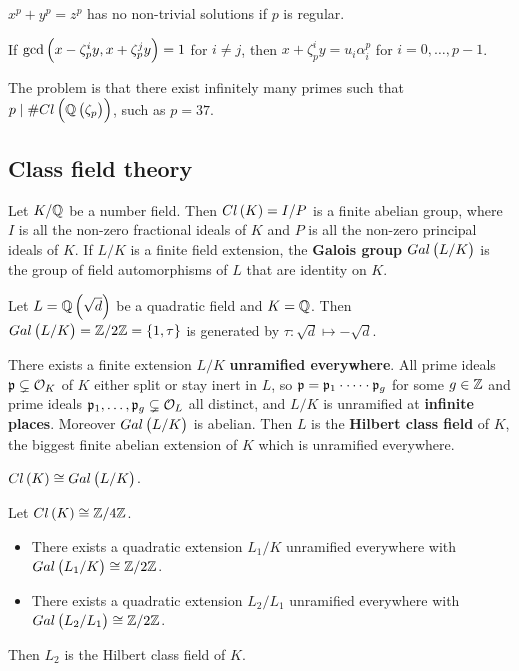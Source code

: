 \begin{theorem}[Kummer]
$ x^p + y^p = z^p $ has no non-trivial solutions if $ p $ is regular.
\end{theorem}

\begin{example*}
If $ \gcd\br{x - \zeta_p^iy, x + \zeta_p^jy} = 1 $ for $ i \ne j $, then $ x + \zeta_p^iy = u_i\alpha_i^p $ for $ i = 0, \dots, p - 1 $.
\end{example*}

The problem is that there exist infinitely many primes such that $ p \mid \#Cl\br{\Q\br{\zeta_p}} $, such as $ p = 37 $.

\subsection{Class field theory}

Let $ K / \mathbb{Q} $ be a number field. Then $ Cl\br{K} = I / P $ is a finite abelian group, where $ I $ is all the non-zero fractional ideals of $ K $ and $ P $ is all the non-zero principal ideals of $ K $. If $ L / K $ is a finite field extension, the \textbf{Galois group} $ Gal\br{L / K} $ is the group of field automorphisms of $ L $ that are identity on $ K $.

\begin{example*}
Let $ L = \Q\br{\sqrt{d}} $ be a quadratic field and $ K = \mathbb{Q} $. Then $ Gal\br{L / K} = \Z / 2\Z = \cbr{1, \tau} $ is generated by $ \tau : \sqrt{d} \mapsto -\sqrt{d} $.
\end{example*}

There exists a finite extension $ L / K $ \textbf{unramified everywhere}. All prime ideals $ \mathfrak{p} \subsetneq \mathcal{O}_K $ of $ K $ either split or stay inert in $ L $, so $ \mathfrak{p} = \mathfrak{p}_1 \cdot \dots \cdot \mathfrak{p}_g $ for some $ g \in \mathbb{Z} $ and prime ideals $ \mathfrak{p}_1, \dots, \mathfrak{p}_g \subsetneq \mathcal{O}_L $ all distinct, and $ L / K $ is unramified at \textbf{infinite places}. Moreover $ Gal\br{L / K} $ is abelian. Then $ L $ is the \textbf{Hilbert class field} of $ K $, the biggest finite abelian extension of $ K $ which is unramified everywhere.

\begin{theorem}
$ Cl\br{K} \cong Gal\br{L / K} $.
\end{theorem}

\begin{example*}
Let $ Cl\br{K} \cong \Z / 4\Z $.
\begin{itemize}
\item There exists a quadratic extension $ L_1 / K $ unramified everywhere with $ Gal\br{L_1 / K} \cong \Z / 2\Z $.
\item There exists a quadratic extension $ L_2 / L_1 $ unramified everywhere with $ Gal\br{L_2 / L_1} \cong \Z / 2\Z $.
\end{itemize}
Then $ L_2 $ is the Hilbert class field of $ K $.
\end{example*}


